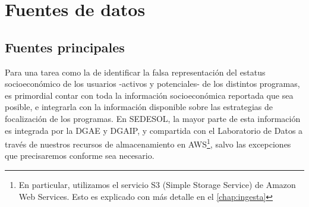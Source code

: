 \chapter{Fuentes de datos}
\label{chap:fuentes}
\section*{Fuentes principales}
Para una tarea como la de identificar la falsa representación del estatus socioeconómico de los usuarios -activos y potenciales- de los distintos programas, es primordial contar con toda la información socioeconómica reportada que sea posible, e integrarla con la información disponible sobre las estrategias de focalización de los programas. En SEDESOL, la mayor parte de esta información es integrada por la DGAE y DGAIP, y compartida con el Laboratorio de Datos a través de nuestros recursos de almacenamiento en AWS\footnote{En particular, utilizamos el servicio S3 (Simple Storage Service) de Amazon Web Services. Esto es explicado con más detalle en el \autoref{chap:ingesta}}, salvo las excepciones que precisaremos conforme sea necesario.
